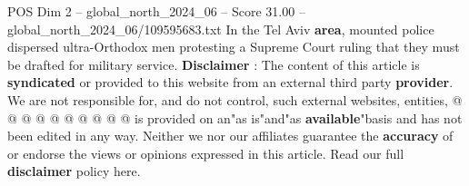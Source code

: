 \begin{textsample}{POS Dim 2 – global\_north\_2024\_06 – Score 31.00 – global\_north\_2024\_06/109595683.txt}
In the Tel Aviv \textbf{area}, mounted police dispersed ultra-Orthodox men protesting a Supreme Court ruling that they must be drafted for military service. \textbf{Disclaimer} : The content of this article is \textbf{syndicated} or provided to this website from an external third party \textbf{provider}.
We are not responsible for, and do not control, such external websites, entities, @ @ @ @ @ @ @ @ @ @ is provided on an"as is"and"as \textbf{available}"basis and has not been edited in any way.
Neither we nor our affiliates guarantee the \textbf{accuracy} of or endorse the views or opinions expressed in this article.
Read our full \textbf{disclaimer} policy here.

\end{textsample}
